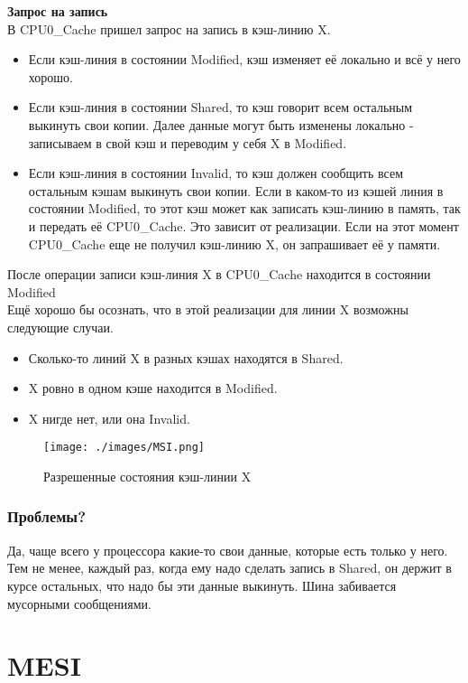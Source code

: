 \documentclass[12pt, a4paper]{article}
\begin{document}
\textbf{Запрос на запись}\\
В CPU0\_Cache пришел запрос на запись в кэш-линию X.
\begin{itemize}
    \item Если кэш-линия в состоянии Modified, кэш изменяет её локально и всё у него хорошо.
    \item Если кэш-линия в состоянии Shared, то кэш говорит всем остальным выкинуть свои копии. Далее данные могут быть изменены локально - записываем в свой кэш и переводим у себя X в Modified. 
    \item Если кэш-линия в состоянии Invalid, то кэш должен сообщить всем остальным кэшам выкинуть свои копии. Если в каком-то из кэшей линия в состоянии Modified, то этот кэш может как записать кэш-линию в память, так и передать её CPU0\_Cache. Это зависит от реализации. Если на этот момент CPU0\_Cache еще не получил кэш-линию X, он запрашивает её у памяти.
\end{itemize}
После операции записи кэш-линия X в CPU0\_Cache находится в состоянии Modified\\

Ещё хорошо бы осознать, что в этой реализации для линии X возможны следующие случаи.\\
\begin{itemize}
    \item Сколько-то линий X в разных кэшах находятся в Shared.\\
    \item X ровно в одном кэше находится в Modified.\\
    \item X нигде нет, или она Invalid.\\
\end{itemize}

\begin{figure}[h]
    \centering
    \texttt{[image: ./images/MSI.png]}
    \caption{Разрешенные состояния кэш-линии X}
    \label{fig:MSI}
\end{figure}
\subsubsection{Проблемы?}
Да, чаще всего у процессора какие-то свои данные, которые есть только у него. Тем не менее, каждый раз, когда ему надо сделать запись в Shared, он держит в курсе остальных, что надо бы эти данные выкинуть. Шина забивается мусорными сообщениями.
\section{MESI}
\end{document}
